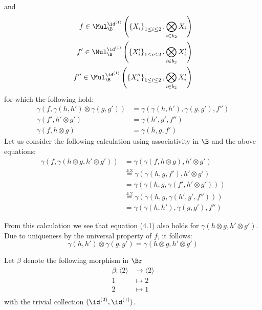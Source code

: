 \begin{const}
    and
    \begin{align*}
        f \in \Mul_{\B}^{\id^{(1)}}\left(\left\{X_i\right\}_{1 \leq i \leq 2},
    \bigotimes_{i \in b_2} X_i\right) \\
    f' \in \Mul_{\B}^{\id^{(1)}}\left(\left\{X_i'\right\}_{1 \leq i \leq 2},
    \bigotimes_{i \in b_2} X_i'\right) \\
    f'' \in \Mul_{\B}^{\id^{(1)}}\left(\left\{X_i''\right\}_{1 \leq i \leq 2},
    \bigotimes_{i \in b_2} X_i'\right)
    \end{align*}
    for which the following hold:
    \begin{align}
        \gamma(f, \gamma(h,h') \otimes \gamma(g,g')) &= \gamma(\gamma(h,h'), \gamma(g,g'), f'') \\
        \gamma(f', h' \otimes g') &= \gamma(h',g',f'') \\
        \gamma(f, h \otimes g) &= \gamma(h,g,f')
    \end{align}
    Let us consider the following calculation using associativity in $\B$ and the above equations:
    \begin{align*}
        \gamma\left(f, \gamma(h \otimes g, h' \otimes g')\right) &= \gamma(\gamma(f, h \otimes g), h' \otimes g') \\
        & \overset{4.3}{=} \gamma(\gamma(h,g,f'), h' \otimes g') \\ 
        & = \gamma(\gamma(h,g, \gamma(f', h' \otimes g'))) \\
        & \overset{4.2}{=}   \gamma(\gamma(h,g,\gamma(h',g',f''))) \\
        & = \gamma(\gamma(h,h'), \gamma(g,g'), f'') 
    \end{align*}

    From this calculation we see that equation (4.1) also holds for $\gamma(h \otimes g, h' \otimes g')$.
    Due to uniqueness by the universal property of $f$, it follows:
    \[
        \gamma(h,h') \otimes \gamma(g,g') = \gamma(h \otimes g, h' \otimes g')
    \]
    

    Let $\beta$ denote the following morphism in $\Br$
     \begin{align*}
         \beta \colon \langle 2 \rangle &\to \langle 2 \rangle \\
         1 &\mapsto 2 \\
         2 &\mapsto 1 \\
     \end{align*}
with the trivial collection $(\id^{(2)}, \id^{(1)})$. 






\end{const}
